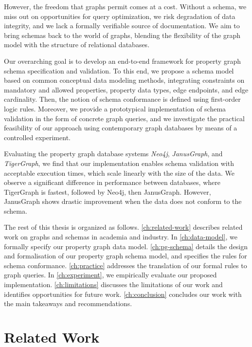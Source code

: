 \documentclass{report}
\theoremstyle{definition}
\begin{document}
However, the freedom that graphs permit comes at a cost. Without a schema, we miss out on opportunities for query optimization, we risk degradation of data integrity, and we lack a formally verifiable source of documentation. We aim to bring schemas back to the world of graphs, blending the flexibility of the graph model with the structure of relational databases.

Our overarching goal is to develop an end-to-end framework for property graph schema specification and validation. To this end, we propose a schema model based on common conceptual data modeling methods, integrating constraints on mandatory and allowed properties, property data types, edge endpoints, and edge cardinality. Then, the notion of schema conformance is defined using first-order logic rules. Moreover, we provide a prototypical implementation of schema validation in the form of concrete graph queries, and we investigate the practical feasibility of our approach using contemporary graph databases by means of a controlled experiment.

Evaluating the property graph database systems \emph{Neo4j}, \emph{JanusGraph}, and \emph{TigerGraph}, we find that our implementation enables schema validation with acceptable execution times, which scale linearly with the size of the data. We observe a significant difference in performance between databases, where TigerGraph is fastest, followed by Neo4j, then JanusGraph. However, JanusGraph shows drastic improvement when the data does not conform to the schema.

The rest of this thesis is organized as follows. \autoref{ch:related-work} describes related work on graphs and schemas in academia and industry. In \autoref{ch:data-model}, we formally specify our property graph data model. \autoref{ch:pg-schema} details the design and formalisation of our property graph schema model, and specifies the rules for schema conformance. \autoref{ch:practice} addresses the translation of our formal rules to graph queries. In \autoref{ch:experiment}, we empirically evaluate our proposed implementation. \autoref{ch:limitations} discusses the limitations of our work and identifies opportunities for future work. \autoref{ch:conclusion} concludes our work with the main takeaways and recommendations.

\chapter{Related Work}
\label{ch:related-work}
\end{document}
